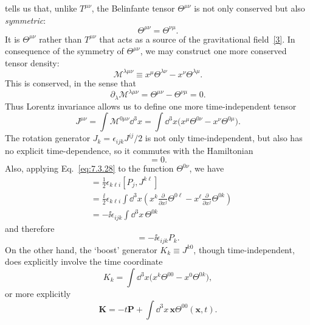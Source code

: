 tells us that, unlike $T^{\mu\nu}$, the Belinfante tensor $\Theta^{\mu\nu}$ is
not only conserved but also \emph{symmetric}:
\begin{equation}
\Theta^{\mu\nu}=\Theta^{\nu\mu}.
\tag{7.4.14}\label{eq:7.4.14}
\end{equation}
It is $\Theta^{\mu\nu}$ rather than $T^{\mu\nu}$ that acts as a source of the
gravitational field~\hyperref[ref:7.3]{[3]}. In consequence of the symmetry of $\Theta^{\mu\nu}$,
we may construct one more conserved tensor density:
\begin{equation}
\mathcal{M}^{\lambda\mu\nu}
\equiv x^\mu\Theta^{\lambda\nu}-x^\nu\Theta^{\lambda\mu}.
\tag{7.4.15}\label{eq:7.4.15}
\end{equation}
This is conserved, in the sense that
\begin{equation}
\partial_\lambda\mathcal{M}^{\lambda\mu\nu}
=\Theta^{\mu\nu}-\Theta^{\nu\mu}=0.
\tag{7.4.16}\label{eq:7.4.16}
\end{equation}
Thus Lorentz invariance allows us to define one more time-independent tensor
\begin{equation}
J^{\mu\nu}=\int\mathcal{M}^{0\mu\nu}\dd^3x
=\int \dd^3x\bigl(x^\mu\Theta^{0\nu}-x^\nu\Theta^{0\mu}\bigr).
\tag{7.4.17}\label{eq:7.4.17}
\end{equation}
The rotation generator $J_k=\epsilon_{ijk}J^{ij}/2$ is not only
time-independent, but also has no explicit time-dependence, so it commutes with
the Hamiltonian
\begin{equation}
[H,\mathbf{J}]=0.
\tag{7.4.18}\label{eq:7.4.18}
\end{equation}
Also, applying Eq.~\eqref{eq:7.3.28} to the function $\Theta^{0\nu}$, we have
\begin{align*}
[P_j,J_i]
&=\frac12\epsilon_{k\ell i}[P_j,J^{k\ell}]\\
&=\frac{\ii}{2}\epsilon_{k\ell i}\int \dd^3x\left(
x^k\frac{\partial}{\partial x^j}\Theta^{0\ell}
-x^\ell\frac{\partial}{\partial x^j}\Theta^{0k}\right)\\
&=-\ii\epsilon_{ijk}\int \dd^3x\,\Theta^{0k}
\end{align*}
and therefore
\begin{equation}
[P_j,J_i]=-\ii\epsilon_{ijk}P_k.
\tag{7.4.19}\label{eq:7.4.19}
\end{equation}
On the other hand, the `boost' generator $K_k\equiv J^{k0}$, though
time-independent, does explicitly involve the time coordinate
\[
K_k=\int \dd^3x\bigl(x^k\Theta^{00}-x^0\Theta^{0k}\bigr),
\]
or more explicitly
\begin{equation}
\mathbf{K}=-t\mathbf{P}+\int \dd^3x\,\mathbf{x}\Theta^{00}(\mathbf{x},t).
\tag{7.4.20}\label{eq:7.4.20}
\end{equation}
